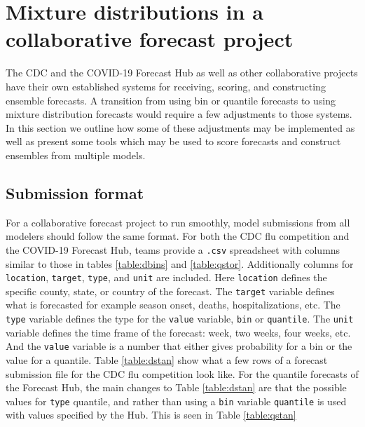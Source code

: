 \documentclass[11pt,notitlepage]{isuthesis}
\begin{document}
\chapter{Mixture distributions in a collaborative forecast project}
\label{section:conmixforc}


The CDC and the COVID-19 Forecast Hub as well as other collaborative projects
have their own established systems for receiving, 
scoring, and constructing ensemble forecasts. A transition from using bin or 
quantile forecasts to using mixture distribution forecasts
would require
a few adjustments to those systems. In this section we outline how some of these
adjustments may be implemented as well as present some tools which may be used
to score forecasts and construct ensembles from multiple models.

\section{Submission format}
For a collaborative forecast project to run smoothly, model submissions from all 
modelers should follow the same format. For both the CDC flu competition and
the COVID-19 Forecast Hub, teams provide a \texttt{.csv} spreadsheet with 
columns 
similar to those in tables \ref{table:dbins} and \ref{table:qstor}. Additionally
columns for \texttt{location}, \texttt{target}, \texttt{type}, and \texttt{unit} 
are included.
Here \texttt{location} defines the specific county, state, or country of the 
forecast. The \texttt{target} variable defines what is forecasted for example
season onset, deaths, hospitalizations, etc. The \texttt{type} variable defines
the type for the \texttt{value} variable, \texttt{bin} or \texttt{quantile}.
The \texttt{unit} variable defines the time frame of the forecast: week,
two weeks, four weeks, etc. And the \texttt{value} variable is a number that 
either gives probability for a bin or the value for a quantile. Table
\ref{table:dstan} show what a few rows of a forecast 
submission file for the CDC flu competition look like.
For the quantile forecasts of the Forecast Hub, the main changes to Table
\ref{table:dstan} are that the possible values for \texttt{type} 
quantile, and rather than using a \texttt{bin} variable \texttt{quantile} is 
used
with values specified by the Hub. This is seen in Table \ref{table:qstan}
\end{document}

